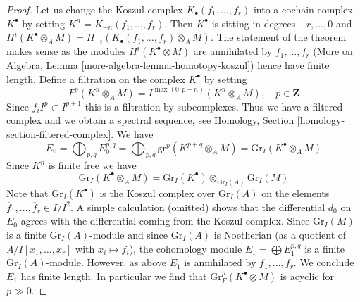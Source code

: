 \documentclass{stacks-project}
\theoremstyle{plain}
\theoremstyle{definition}
\theoremstyle{remark}
\numberwithin{equation}{subsection}
\begin{document}
\begin{proof}
Let us change the Koszul complex $K_\bullet(f_1, \ldots, f_r)$ into a cochain
complex $K^\bullet$ by setting $K^n = K_{-n}(f_1, \ldots, f_r)$.
Then $K^\bullet$ is sitting in degrees $-r, \ldots, 0$ and
$H^i(K^\bullet \otimes_A M) = H_{-i}(K_\bullet(f_1, \ldots, f_r) \otimes_A M)$.
The statement of the theorem makes sense as the modules
$H^i(K^\bullet \otimes M)$ are annihilated by $f_1, \ldots, f_r$
(More on Algebra, Lemma \ref{more-algebra-lemma-homotopy-koszul})
hence have finite length.
Define a filtration on the complex $K^\bullet$ by setting
$$
F^p(K^n \otimes_A M) =
I^{\max(0, p + n)}(K^n \otimes_A M),\quad p \in \mathbf{Z}
$$
Since $f_i I^p \subset I^{p + 1}$ this is a filtration by subcomplexes.
Thus we have a filtered complex and we obtain a spectral sequence, see
Homology, Section \ref{homology-section-filtered-complex}.
We have
$$
E_0 = \bigoplus\nolimits_{p, q} E_0^{p, q} =
\bigoplus\nolimits_{p, q} \text{gr}^p(K^{p + q} \otimes_A M) =
\text{Gr}_I(K^\bullet \otimes_A M)
$$
Since $K^n$ is finite free we have
$$
\text{Gr}_I(K^\bullet \otimes_A M) =
\text{Gr}_I(K^\bullet) \otimes_{\text{Gr}_I(A)} \text{Gr}_I(M)
$$
Note that $\text{Gr}_I(K^\bullet)$ is the Koszul
complex over $\text{Gr}_I(A)$ on the elements
$\overline{f}_1, \ldots, \overline{f}_r \in I/I^2$.
A simple calculation (omitted)
shows that the differential $d_0$ on $E_0$
agrees with the differential coming from the Koszul complex.
Since $\text{Gr}_I(M)$ is a finite $\text{Gr}_I(A)$-module
and since $\text{Gr}_I(A)$ is Noetherian (as a quotient
of $A/I[x_1, \ldots, x_r]$ with $x_i \mapsto \overline{f}_i$), the
cohomology module $E_1 = \bigoplus E_1^{p, q}$
is a finite $\text{Gr}_I(A)$-module. However, as above
$E_1$ is annihilated by $\overline{f}_1, \ldots, \overline{f}_r$.
We conclude $E_1$ has finite length.
In particular we find that $\text{Gr}^p_F(K^\bullet \otimes M)$ is
acyclic for $p \gg 0$.


\end{proof}
\end{document}
